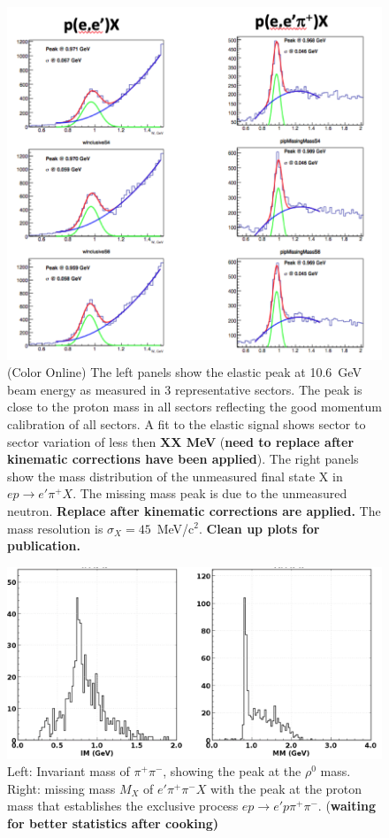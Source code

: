 \documentclass[final,3p,twocolumn]{elsarticle}
\begin{document}
\begin{figure}[htbp!]
\centerline{\includegraphics[width=1.0\columnwidth]{elastic_pi+n.png}}
\caption{(Color Online) The left panels show the elastic peak at 10.6~GeV beam energy as measured in 3 representative sectors. The
peak is close to the proton mass in all sectors reflecting the good momentum calibration of all sectors. A fit to the
elastic signal shows sector to sector variation of less then {\bf XX MeV} ({\bf need to replace after kinematic
corrections have been applied}). The right panels show the mass distribution of the unmeasured final state X in
$ep \to e'\pi^+ X$. The missing mass peak is due to the unmeasured neutron. {\bf Replace after kinematic corrections are applied.}
The mass resolution is $\sigma_X = 45$~MeV/c$^2$. {\bf Clean up plots for publication.}} 
\label{elastic-peak}
\end{figure} 

\begin{figure}[htbp!]
\centerline{\includegraphics[width=1.0\columnwidth]{pip-pim-p.png}}
\caption{Left: Invariant mass of $\pi^+\pi^-$, showing the peak at the $\rho^0$ mass. Right: missing mass 
$M_X$  of $e'\pi^+\pi^-X$ with the peak at the proton mass that establishes the exclusive process
$ep\to e' p \pi^+\pi^-$. ({\bf waiting for better statistics after cooking)}}
\label{pip-pim-p}
\end{figure} 
\end{document}
